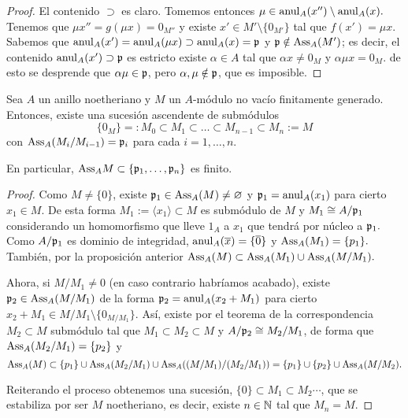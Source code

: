 \documentclass[../main.tex]{subfiles}
\begin{document}
\begin{proof}
		El contenido $\supset$ es claro. Tomemos entonces $\mu\in\operatorname{anul}_A(x'')\setminus\operatorname{anul}_A(x).$ Tenemos que $\mu x''=g(\mu x)=0_{M''}$ y existe $x'\in M'\setminus\{0_{M'}\}$ tal que $f(x')=\mu x.$ Sabemos que $\operatorname{anul}_A(x')=\operatorname{anul}_A(\mu x)\supset\operatorname{anul}_A(x)=\mathfrak{p}$ y $\mathfrak{p}\notin\text{Ass}_A(M')$; es decir, el contenido $\operatorname{anul}_A(x')\supset\mathfrak{p}$ es estricto existe $\alpha\in A$ tal que $\alpha x\neq 0_M$ y $\alpha\mu x=0_M.$ de esto se desprende que $\alpha\mu\in\mathfrak{p}$, pero $\alpha,\mu\notin\mathfrak{p}$, que es imposible.
	\end{proof}
	
	\begin{proposition}
		Sea $A$ un anillo noetheriano y $M$ un $A$-módulo no vacío finitamente generado. Entonces, existe una sucesión ascendente de submódulos $$\{0_M\}=:M_0\subset M_1\subset\dots\subset M_{n-1}\subset M_n:=M$$ con $\text{Ass}_A(M_i/M_{i-1})=\mathfrak{p}_i$ para cada $i=1,\dots,n$.
		
		En particular, $\text{Ass}_AM\subset\{\mathfrak{p}_1,\dots,\mathfrak{p}_n\}$ es finito.
	\end{proposition}
	
	\begin{proof}
		Como $M\neq\{0\}$, existe $\mathfrak{p}_1\in\text{Ass}_A(M)\neq\varnothing$ y $\mathfrak{p}_1=\operatorname{anul}_A(x_1)$ para cierto $x_1\in M.$ De esta forma $M_1:=\langle x_1\rangle\subset M$ es submódulo de $M$ y $M_1\cong A/{\mathfrak{p}_1}$ considerando un homomorfismo que lleve $1_A$ a $x_1$ que tendrá por núcleo a $\mathfrak{p}_1.$ Como $A/{\mathfrak{p}_1}$ es dominio de integridad, $\operatorname{anul}_A(\overline{x})=\{\overline{0}\}$ y $\text{Ass}_A(M_1)=\{p_1\}.$ También, por la proposición anterior $\text{Ass}_A(M)\subset\text{Ass}_A(M_1)\cup\text{Ass}_A{(M/M_1)}.$
		
		Ahora, si $M/M_1\neq 0$ (en caso contrario habríamos acabado), existe $\mathfrak{p}_2\in\text{Ass}_A(M/M_1)$ de la forma $\mathfrak{p}_2=\operatorname{anul}_A(x_2+ M_1)$ para cierto $x_2+ M_1\in M/M_1\setminus\{0_{M/M_1}\}.$ Así, existe por el teorema de la correspondencia $M_2\subset M$ submódulo tal que $M_1\subset M_2\subset M$ y $A/{\mathfrak{p}_2}\cong M_2/M_1$, de forma que $\text{Ass}_A(M_2/M_1)=\{p_2\}$ y 
		\begin{equation*}
		\text{Ass}_A(M)\subset\{p_1\}\cup\text{Ass}_A(M_2/M_1)\cup\text{Ass}_A((M/M_1)/(M_2/M_1))\\
		=\{p_1\}\cup\{p_2\}\cup\text{Ass}_A(M/M_2).
		\end{equation*}
		
		Reiterando el proceso obtenemos una sucesión, $\{0\}\subset M_1\subset M_2\cdots$, que se estabiliza por ser $M$ noetheriano, es decir, existe $n\in\mathbb{N}$ tal que $M_n=M.$
	\end{proof}
	
\end{document}
